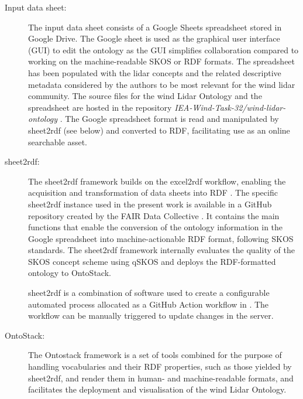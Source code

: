 \documentclass[remotesensing,article,submit,pdftex,moreauthors]{Definitions/mdpi}
\begin{document}
\begin{description}
    
    \item [Input data sheet:] The input data sheet consists of a Google Sheets spreadsheet stored in Google Drive. The Google sheet is used as the graphical user interface (GUI) to edit the ontology as the GUI simplifies collaboration compared to working on the machine-readable SKOS or RDF formats. The spreadsheet has been populated with the lidar concepts and the related descriptive metadata considered by the authors to be most relevant for the wind lidar community. The source files for the wind Lidar Ontology and the spreadsheet are hosted in the repository  \textit{IEA-Wind-Task-32/wind-lidar-ontology} \cite{TCP32_GitHub_repo}.
    The Google spreadsheet format is read and manipulated by sheet2rdf (see below) and converted to RDF, facilitating use as an online searchable asset. 
    
    \item [sheet2rdf:] The sheet2rdf \cite{ref-Fiorelli2015, nikola_vasiljevic_2021_4432136} framework builds on the excel2rdf \cite{ref-excel2rdf} workflow, enabling the acquisition and transformation of data sheets into RDF \cite{ref-sheet2rdf}. The specific sheet2rdf instance used in the present work is available in a GitHub repository created by the FAIR Data Collective \cite{ref-FAIRsheet2rdf}. It contains the main functions that enable the conversion of the ontology information in the Google spreadsheet into machine-actionable RDF format, following SKOS standards. The sheet2rdf framework internally evaluates the quality of the SKOS concept scheme using qSKOS \cite{ref-W3C-qSKOS} and deploys the RDF-formatted ontology to OntoStack. 
    
    sheet2rdf is a combination of software used to create a configurable automated process allocated as a GitHub Action workflow in \cite{ref-FAIRsheet2rdf}. The workflow can be manually triggered to update changes in the server.
    
    \item [OntoStack:] The Ontostack framework \cite{ref-OntoStack}  is a set of tools combined for the purpose of handling vocabularies and their RDF properties, such as those yielded by sheet2rdf, and render them in human- and machine-readable formats, and facilitates the deployment and visualisation of the wind Lidar Ontology.
    

\end{description}
\end{document}
